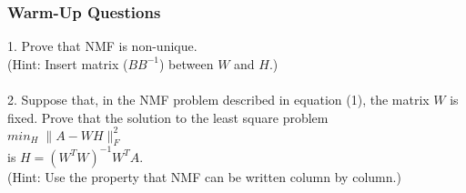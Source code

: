 \documentclass[12pt,letterpaper]{article}
\begin{document}
\subsubsection{Warm-Up Questions}
1. Prove that NMF is non-unique. \\
(Hint: Insert matrix ($BB^{-1}$) between $W$ and $H$.) \\
\\
2. Suppose that, in the NMF problem described in equation (1), the matrix $W$ is fixed. Prove that the solution to the least square problem\\ 
\indent $min_{H} \; \| A - WH \|_F^2 $ \\ is $H = (W^TW)^{-1}W^TA$. \\
(Hint: Use the property that NMF can be written column by column.) 
\end{document}
